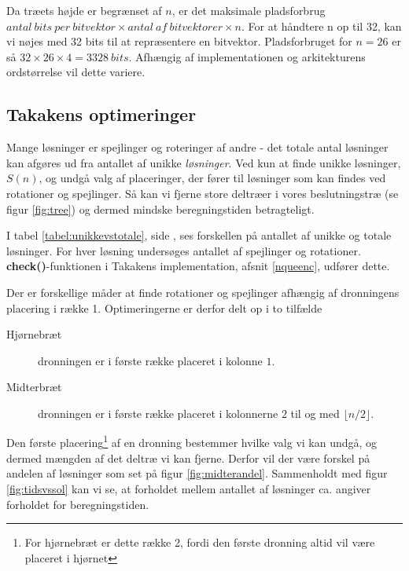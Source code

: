 \documentclass[final,a4paper,11pt]{article}
\begin{document}
Da træets højde er begrænset af $n$, er det maksimale pladsforbrug $antal\ bits\ per\ bitvektor \times antal\ af\ bitvektorer \times n$. For at håndtere n op til 32, kan vi nøjes med 32 bits til at repræsentere en bitvektor. Pladsforbruget for $n=26$ er så $32\times 26 \times 4 = 3328\ bits$. Afhængig af implementationen og arkitekturens ordstørrelse vil dette variere. 

\subsection{Takakens optimeringer}\label{takalgo}

Mange løsninger er spejlinger og roteringer af andre - det totale antal løsninger kan afgøres ud fra antallet af unikke \emph{løsninger}. Ved kun at finde unikke løsninger, $S(n)$, og undgå valg af placeringer, der fører til løsninger som kan findes ved rotationer og spejlinger. Så kan vi fjerne store deltræer i vores beslutningstræ (se figur \ref{fig:tree}) og dermed mindske beregningstiden betragteligt.

I tabel \ref{tabel:unikkevstotale}, side \pageref{tabel:unikkevstotale}, ses forskellen på antallet af unikke og totale løsninger. For hver løsning undersøges antallet af spejlinger og rotationer. \textbf{check()}-funktionen i Takakens implementation, afsnit \ref{nqueenc}, udfører dette. 
 
Der er forskellige måder at finde rotationer og spejlinger afhængig af dronningens placering i række 1. Optimeringerne er derfor delt op i to tilfælde

\begin{description}
	\item[Hjørnebræt] dronningen er i første række placeret i kolonne $1$.
	\item[Midterbræt] dronningen er i første række placeret i kolonnerne $2$  til og med $\lfloor n/2 \rfloor$.
\end{description}

Den første placering\footnote{For hjørnebræt er dette række 2, fordi den første dronning altid vil være placeret i hjørnet} af en dronning bestemmer hvilke valg vi kan undgå, og dermed mængden af det deltræ vi kan fjerne. Derfor vil der være forskel på andelen af løsninger som set på figur \ref{fig:midterandel}. Sammenholdt med figur \ref{fig:tidsvssol} kan vi se, at forholdet mellem antallet af løsninger ca. angiver forholdet for beregningstiden.
\end{document}
